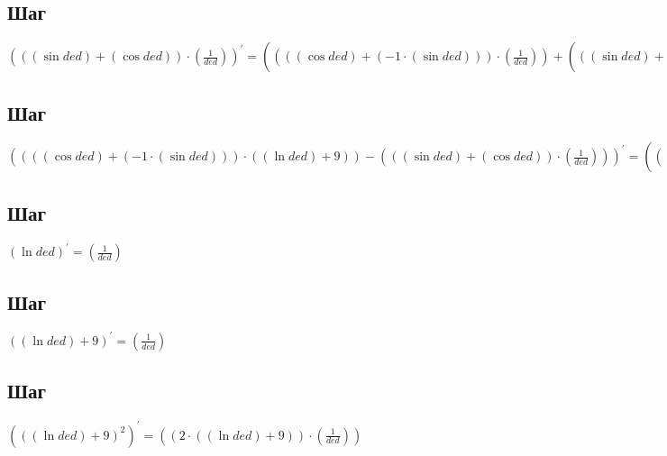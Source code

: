\documentclass[12pt, letterpaper]{report}
\begin{document}
\subsection{Шаг}
\begin{center} $({({(\sin{ded})}+{(\cos{ded})})}\cdot{(\frac{1}{ded})})^{\prime} = ({({({(\cos{ded})}+{({-1}\cdot{(\sin{ded})})})}\cdot{(\frac{1}{ded})})}+{({({(\sin{ded})}+{(\cos{ded})})}\cdot{(\frac{-1}{({ded}^{2})})})})$ \end{center} 

\subsection{Шаг}
\begin{center} $({({({(\cos{ded})}+{({-1}\cdot{(\sin{ded})})})}\cdot{({(\ln{ded})}+{9})})}-{({({(\sin{ded})}+{(\cos{ded})})}\cdot{(\frac{1}{ded})})})^{\prime} = ({({({({({-1}\cdot{(\sin{ded})})}+{({-1}\cdot{(\cos{ded})})})}\cdot{({(\ln{ded})}+{9})})}+{({({(\cos{ded})}+{({-1}\cdot{(\sin{ded})})})}\cdot{(\frac{1}{ded})})})}-{({({({(\cos{ded})}+{({-1}\cdot{(\sin{ded})})})}\cdot{(\frac{1}{ded})})}+{({({(\sin{ded})}+{(\cos{ded})})}\cdot{(\frac{-1}{({ded}^{2})})})})})$ \end{center} 

\subsection{Шаг}
\begin{center} $(\ln{ded})^{\prime} = (\frac{1}{ded})$ \end{center} 

\subsection{Шаг}
\begin{center} $({(\ln{ded})}+{9})^{\prime} = (\frac{1}{ded})$ \end{center} 

\subsection{Шаг}
\begin{center} $({({(\ln{ded})}+{9})}^{2})^{\prime} = ({({2}\cdot{({(\ln{ded})}+{9})})}\cdot{(\frac{1}{ded})})$ \end{center} 
\end{document}
